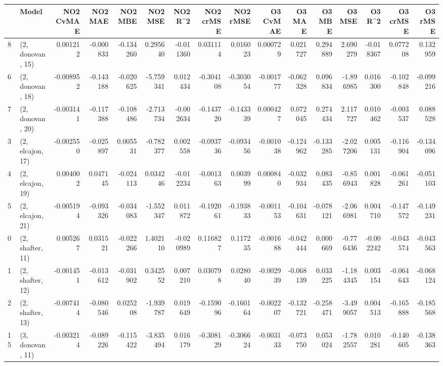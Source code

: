 \begin{tabular}{llrrrrrrrrrrrrrr}
\toprule
{} &             Model &  NO2 CvMAE &   NO2 MAE &   NO2 MBE &    NO2 MSE &   NO2 R\textasciicircum2 &  NO2 crMSE &  NO2 rMSE &  O3 CvMAE &    O3 MAE &    O3 MBE &     O3 MSE &    O3 R\textasciicircum2 &  O3 crMSE &   O3 rMSE \\
\midrule
8  &  (2, donovan, 15) &   0.001212 & -0.000833 & -0.134260 &   0.295640 & -0.011360 &   0.031114 &  0.016023 &  0.000729 &  0.021727 &  0.294889 &   2.690279 & -0.018367 &  0.077208 &  0.132959 \\
6  &  (2, donovan, 18) &  -0.008952 & -0.143188 & -0.020625 &  -5.759341 &  0.012434 &  -0.304108 & -0.303054 & -0.001777 & -0.062328 &  0.096834 &  -1.896985 &  0.016300 & -0.102848 & -0.099216 \\
7  &  (2, donovan, 20) &  -0.003141 & -0.117388 & -0.108486 &  -2.713734 & -0.002634 &  -0.143720 & -0.143339 &  0.000427 &  0.072045 &  0.274434 &   2.117727 &  0.010462 & -0.003537 &  0.088528 \\
3  &  (2, elcajon, 17) &  -0.002550 & -0.025897 &  0.005531 &  -0.782377 &  0.002558 &  -0.093736 & -0.093456 & -0.001038 & -0.124962 & -0.133285 &  -2.027206 &  0.005131 & -0.116904 & -0.134096 \\
4  &  (2, elcajon, 19) &   0.004002 &  0.047145 & -0.024113 &   0.034246 & -0.012234 &  -0.001363 &  0.003999 &  0.000840 & -0.032934 &  0.083435 &  -0.856943 &  0.001828 & -0.061261 & -0.051103 \\
5  &  (2, elcajon, 21) &  -0.005194 & -0.093326 & -0.034083 &  -1.552347 &  0.011872 &  -0.192061 & -0.193833 & -0.001153 & -0.104631 & -0.078121 &  -2.066981 &  0.004710 & -0.147572 & -0.149231 \\
0  &  (2, shafter, 11) &   0.005267 &  0.031521 & -0.022266 &   1.402110 & -0.020989 &   0.116827 &  0.117235 & -0.001688 & -0.042444 &  0.000669 &  -0.776436 & -0.002242 & -0.043574 & -0.043563 \\
1  &  (2, shafter, 12) &  -0.001451 & -0.013612 & -0.031902 &   0.342552 &  0.007210 &   0.030798 &  0.028040 & -0.002939 & -0.068139 &  0.033225 &  -1.184345 &  0.003154 & -0.064643 & -0.068124 \\
2  &  (2, shafter, 13) &  -0.007414 & -0.080546 &  0.025208 &  -1.939787 &  0.019649 &  -0.159096 & -0.160164 & -0.002207 & -0.132721 & -0.258471 &  -3.499057 &  0.004513 & -0.165888 & -0.185568 \\
15 &  (3, donovan, 11) &  -0.003214 & -0.089226 & -0.115422 &  -3.835494 &  0.016179 &  -0.308129 & -0.306624 & -0.003133 & -0.073750 &  0.053024 &  -1.782557 &  0.010281 & -0.140605 & -0.138363 \\

\end{tabular}
